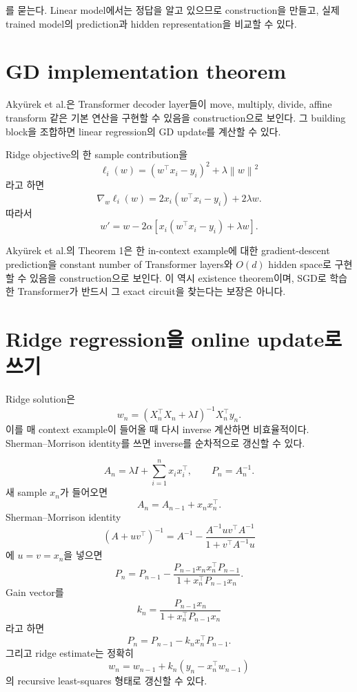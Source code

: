 \documentclass[11pt,a4paper,oneside,openany]{memoir}
\newcommand{\norm}[1]{\left\lVert #1\right\rVert}
\theoremstyle{definition}
\begin{document}
를 묻는다. Linear model에서는 정답을 알고 있으므로 construction을 만들고, 실제 trained model의 prediction과 hidden representation을 비교할 수 있다.

\section{GD implementation theorem}

Akyürek et al.은 Transformer decoder layer들이 move, multiply, divide, affine transform 같은 기본 연산을 구현할 수 있음을 construction으로 보인다.
그 building block을 조합하면 linear regression의 GD update를 계산할 수 있다.

Ridge objective의 한 sample contribution을
\[
\ell_i(w)=(w^\top x_i-y_i)^2+\lambda\norm w^2
\]
라고 하면
\[
\nabla_w\ell_i(w)
=2x_i(w^\top x_i-y_i)+2\lambda w.
\]
따라서
\[
w'
=w-2\alpha\left[x_i(w^\top x_i-y_i)+\lambda w\right].
\]

\begin{paperbox}
Akyürek et al.의 Theorem 1은 한 in-context example에 대한 gradient-descent prediction을 constant number of Transformer layers와 $O(d)$ hidden space로 구현할 수 있음을 construction으로 보인다. 이 역시 existence theorem이며, SGD로 학습한 Transformer가 반드시 그 exact circuit을 찾는다는 보장은 아니다.
\end{paperbox}

\section{Ridge regression을 online update로 쓰기}

Ridge solution은
\[
w_n=(X_n^\top X_n+\lambda I)^{-1}X_n^\top y_n.
\]
이를 매 context example이 들어올 때 다시 inverse 계산하면 비효율적이다.
Sherman--Morrison identity를 쓰면 inverse를 순차적으로 갱신할 수 있다.

\begin{suppbox}
\[
A_n=\lambda I+\sum_{i=1}^n x_ix_i^\top,
\qquad
P_n=A_n^{-1}.
\]
새 sample $x_n$가 들어오면
\[
A_n=A_{n-1}+x_nx_n^\top.
\]
Sherman--Morrison identity
\[
(A+uv^\top)^{-1}
=A^{-1}-\frac{A^{-1}uv^\top A^{-1}}{1+v^\top A^{-1}u}
\]
에 $u=v=x_n$을 넣으면
\[
P_n
=P_{n-1}
-\frac{P_{n-1}x_nx_n^\top P_{n-1}}
{1+x_n^\top P_{n-1}x_n}.
\]
Gain vector를
\[
k_n
=\frac{P_{n-1}x_n}{1+x_n^\top P_{n-1}x_n}
\]
라고 하면
\[
P_n=P_{n-1}-k_nx_n^\top P_{n-1}.
\]
그리고 ridge estimate는 정확히
\[
\boxed{
w_n=w_{n-1}+k_n(y_n-x_n^\top w_{n-1})}
\]
의 recursive least-squares 형태로 갱신할 수 있다.
\end{suppbox}
\end{document}

